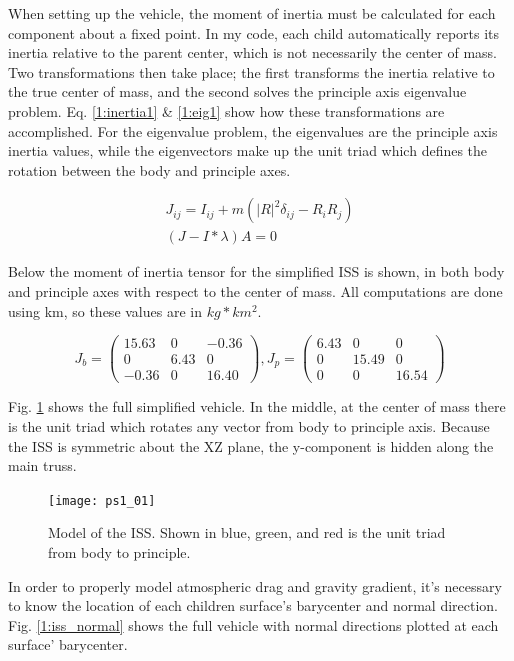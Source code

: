 \documentclass[12pt, letterpaper]{article}
\begin{document}
When setting up the vehicle, the moment of inertia must be calculated for each component about a fixed point. In my code, each child automatically reports its inertia relative to the parent center, which is not necessarily the center of mass. Two transformations then take place; the first transforms the inertia relative to the true center of mass, and the second solves the principle axis eigenvalue problem. Eq. \ref{1:inertia1} \& \ref{1:eig1} show how these transformations are accomplished. For the eigenvalue problem, the eigenvalues are the principle axis inertia values, while the eigenvectors make up the unit triad which defines the rotation between the body and principle axes.

\begin{gather}
J_{ij} = I_{ij} + m(|R|^2\delta_{ij}-R_iR_j)
\label{1:inertia1} \\ 
(J-I*\lambda)A=0
\label{1:eig1}
\end{gather}

Below the moment of inertia tensor for the simplified ISS is shown, in both body and principle axes with respect to the center of mass. All computations are done using km, so these values are in $kg*km^2$.


\begin{equation}
J_b =\left(\begin{array}{ccc} 15.63 & 0 & -0.36\\ 0 & 6.43 & 0\\ -0.36 & 0 & 16.40 \end{array}\right), J_p =
\left(\begin{array}{ccc} 6.43 & 0 & 0\\ 0 & 15.49 & 0\\ 0 & 0 & 16.54 \end{array}\right)
\label{1:eqJ}
\end{equation}


Fig. \ref{1:iss} shows the full simplified vehicle. In the middle, at the center of mass there is the unit triad which rotates any vector from body to principle axis. Because the ISS is symmetric about the XZ plane, the y-component is hidden along the main truss. 

\begin{figure}[H]
	\centering
	\texttt{[image: ps1\_01]}
	\caption{Model of the ISS. Shown in blue, green, and red is the unit triad from body to principle.}
	\label{1:iss}
\end{figure}


In order to properly model atmospheric drag and gravity gradient, it's necessary to know the location of each children surface's barycenter and normal direction. Fig. \ref{1:iss_normal} shows the full vehicle with normal directions plotted at each surface' barycenter.
\end{document}
